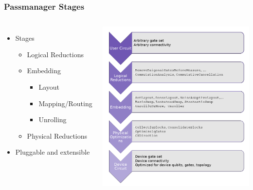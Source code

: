 \documentclass[aspectratio=169,11pt,hyperref={colorlinks=true}]{beamer}
\begin{document}
\begin{frame}
    \frametitle{Passmanager Stages}
    \begin{columns}
            \begin{itemize}
                \item Stages
                    \begin{itemize}
                        \item Logical Reductions
                        \item Embedding
                            \begin{itemize}
                                \item Layout
                                \item Mapping/Routing
                                \item Unrolling
                            \end{itemize}
                        \item Physical Reductions
                    \end{itemize}
                \item Pluggable and extensible
            \end{itemize}
            \includegraphics[width=\textwidth]{passmanager_stages.png}
    \end{columns}
\end{frame}
\end{document}
